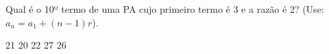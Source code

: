 Qual é o 10º termo de uma PA cujo primeiro termo é 3 e a razão é 2? (Use: $a_n=a_1+(n-1)r$).

21
20
22
27
26





